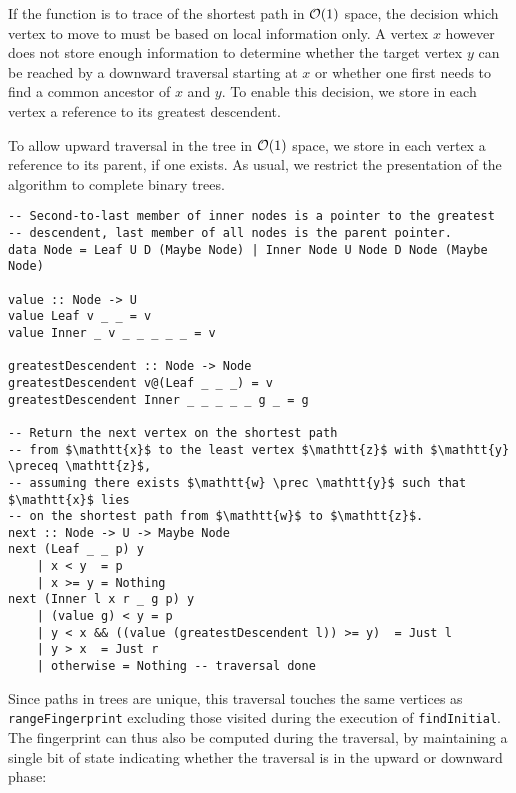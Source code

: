 If the function is to trace of the shortest path in $\mathcal{O}(1)$ space, the decision which vertex to move to must be based on local information only. A vertex $x$ however does not store enough information to determine whether the target vertex $y$ can be reached by a downward traversal starting at $x$ or whether one first needs to find a common ancestor of $x$ and $y$. To enable this decision, we store in each vertex a reference to its greatest descendent.

To allow upward traversal in the tree in $\mathcal{O}(1)$ space, we store in each vertex a reference to its parent, if one exists. As usual, we restrict the presentation of the algorithm to complete binary trees.

\begin{verbatim}
-- Second-to-last member of inner nodes is a pointer to the greatest
-- descendent, last member of all nodes is the parent pointer.
data Node = Leaf U D (Maybe Node) | Inner Node U Node D Node (Maybe Node)

value :: Node -> U
value Leaf v _ _ = v
value Inner _ v _ _ _ _ _ = v

greatestDescendent :: Node -> Node
greatestDescendent v@(Leaf _ _ _) = v
greatestDescendent Inner _ _ _ _ _ g _ = g

-- Return the next vertex on the shortest path
-- from $\mathtt{x}$ to the least vertex $\mathtt{z}$ with $\mathtt{y} \preceq \mathtt{z}$,
-- assuming there exists $\mathtt{w} \prec \mathtt{y}$ such that $\mathtt{x}$ lies
-- on the shortest path from $\mathtt{w}$ to $\mathtt{z}$.
next :: Node -> U -> Maybe Node
next (Leaf _ _ p) y
    | x < y  = p
    | x >= y = Nothing
next (Inner l x r _ g p) y
    | (value g) < y = p
    | y < x && ((value (greatestDescendent l)) >= y)  = Just l
    | y > x  = Just r
    | otherwise = Nothing -- traversal done
\end{verbatim}

Since paths in trees are unique, this traversal touches the same vertices as \texttt{rangeFingerprint} excluding those visited during the execution of \texttt{findInitial}. The fingerprint can thus also be computed during the traversal, by maintaining a single bit of state indicating whether the traversal is in the upward or downward phase:

